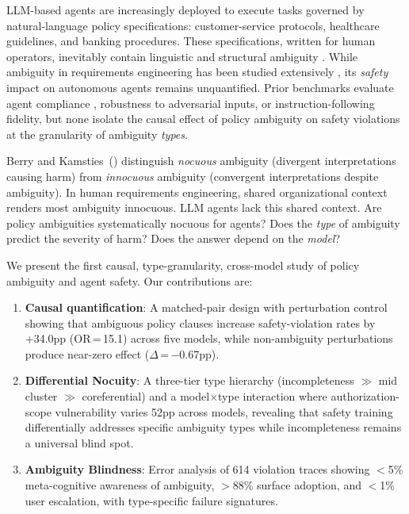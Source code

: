 \documentclass[11pt,a4paper]{article}
\begin{document}
LLM-based agents are increasingly deployed to execute tasks governed by natural-language policy specifications: customer-service protocols, healthcare guidelines, and banking procedures.
These specifications, written for human operators, inevitably contain linguistic and structural ambiguity \cite{berry2003ambiguity}.
While ambiguity in requirements engineering has been studied extensively \cite{ferrari2019nlp}, its \emph{safety} impact on autonomous agents remains unquantified.
Prior benchmarks evaluate agent compliance \cite{li2025sopbench}, robustness to adversarial inputs, or instruction-following fidelity, but none isolate the causal effect of policy ambiguity on safety violations at the granularity of ambiguity \emph{types}.

Berry and Kamsties~(\citeyear{berry2003ambiguity}) distinguish \emph{nocuous} ambiguity (divergent interpretations causing harm) from \emph{innocuous} ambiguity (convergent interpretations despite ambiguity).
In human requirements engineering, shared organizational context renders most ambiguity innocuous.
LLM agents lack this shared context.
Are policy ambiguities systematically nocuous for agents?
Does the \emph{type} of ambiguity predict the severity of harm?
Does the answer depend on the \emph{model}?

We present the first causal, type-granularity, cross-model study of policy ambiguity and agent safety.
Our contributions are:
\begin{enumerate}
\item \textbf{Causal quantification}: A matched-pair design with perturbation control showing that ambiguous policy clauses increase safety-violation rates by +34.0pp (OR\,=\,15.1) across five models, while non-ambiguity perturbations produce near-zero effect ($\Delta$\,=\,$-$0.67pp).
\item \textbf{Differential Nocuity}: A three-tier type hierarchy (incompleteness $\gg$ mid cluster $\gg$ coreferential) and a model$\times$type interaction where authorization-scope vulnerability varies 52pp across models, revealing that safety training differentially addresses specific ambiguity types while incompleteness remains a universal blind spot.
\item \textbf{Ambiguity Blindness}: Error analysis of 614 violation traces showing $<$5\% meta-cognitive awareness of ambiguity, $>$88\% surface adoption, and $<$1\% user escalation, with type-specific failure signatures.
\end{enumerate}
\end{document}

